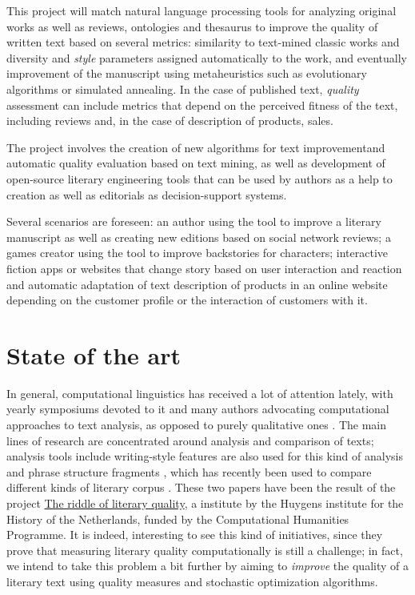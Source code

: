 \documentclass[a4paper,12pt,twocolumn]{article}
\begin{document}
This project will match natural language processing tools for
analyzing original works as well as reviews, ontologies and thesaurus
to improve the quality of written text based on several metrics: similarity to
text-mined classic works and diversity and {\em style} parameters
assigned automatically to the work, and eventually improvement of the
manuscript using metaheuristics such as evolutionary algorithms or
simulated annealing. In the case of published text, {\em quality}
assessment can include metrics that depend on the perceived fitness of
the text, including reviews and, in the case of description of
products, sales.

The project involves the creation of new algorithms for text
improvementand automatic quality
evaluation based on text mining, as well as development of open-source
literary engineering tools that can be used by authors as a help to
creation as well as editorials as decision-support systems.  

Several scenarios are foreseen: an author using the tool to improve a
literary manuscript as well as creating new editions based on social
network reviews; a games creator using the tool to improve backstories
for characters; interactive fiction apps or websites that change story
based on user interaction and reaction and automatic adaptation of
text description of products in an online website depending on the
customer profile or the interaction of customers with it. 

\section{State of the art}

In general, computational linguistics  has received a lot of
attention lately, with yearly symposiums devoted to it and many
authors advocating computational approaches to text analysis, as
opposed to purely qualitative ones \cite{roque2012towards}. The main lines
of research are concentrated around analysis and comparison of texts;
analysis tools include  writing-style
features \cite{ASI:ASI20316} are also used for this kind of analysis
and phrase structure fragments \cite{van2012literary}, which has
recently been used to compare different kinds of literary corpus
\cite{jautze2013high}. These two papers have been the result of the
project \href{http://literaryquality.huygens.knaw.nl/}{The riddle of
  literary quality}, a institute by the Huygens institute for the
History of the Netherlands, funded by the Computational Humanities
Programme. It is indeed, interesting to see this kind of initiatives,
since they prove that measuring literary quality computationally is
still a challenge; in fact, we intend to take this problem a bit
further by aiming to {\em improve} the quality of a literary text
using quality measures and stochastic optimization algorithms. 
\end{document}
